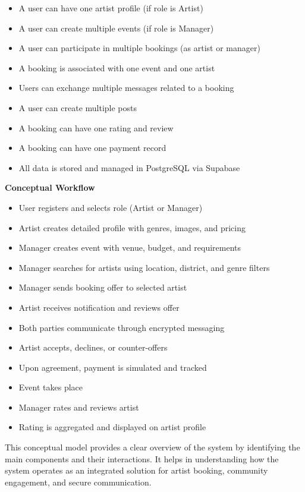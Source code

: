 \documentclass[12pt,a4paper]{report}
\begin{document}
\begin{itemize}
\item A user can have one artist profile (if role is Artist)
\item A user can create multiple events (if role is Manager)
\item A user can participate in multiple bookings (as artist or manager)
\item A booking is associated with one event and one artist
\item Users can exchange multiple messages related to a booking
\item A user can create multiple posts
\item A booking can have one rating and review
\item A booking can have one payment record
\item All data is stored and managed in PostgreSQL via Supabase
\end{itemize}

\textbf{Conceptual Workflow}

\begin{itemize}
\item User registers and selects role (Artist or Manager)
\item Artist creates detailed profile with genres, images, and pricing
\item Manager creates event with venue, budget, and requirements
\item Manager searches for artists using location, district, and genre filters
\item Manager sends booking offer to selected artist
\item Artist receives notification and reviews offer
\item Both parties communicate through encrypted messaging
\item Artist accepts, declines, or counter-offers
\item Upon agreement, payment is simulated and tracked
\item Event takes place
\item Manager rates and reviews artist
\item Rating is aggregated and displayed on artist profile
\end{itemize}

This conceptual model provides a clear overview of the system by identifying the main components and their interactions. It helps in understanding how the system operates as an integrated solution for artist booking, community engagement, and secure communication.
\end{document}
